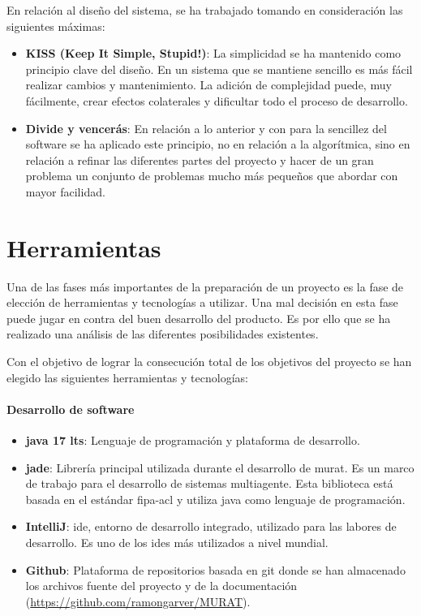 En relación al diseño del sistema, se ha trabajado tomando en consideración las siguientes máximas: 
\begin{itemize}
    \item \textbf{KISS (Keep It Simple, Stupid!)}: La simplicidad se ha mantenido como principio clave del diseño. En un sistema que se mantiene sencillo es más fácil realizar cambios y mantenimiento. La adición de complejidad puede, muy fácilmente, crear efectos colaterales y dificultar todo el proceso de desarrollo.
    \item \textbf{Divide y vencerás}: En relación a lo anterior y con para la sencillez del software se ha aplicado este principio, no en relación a la algorítmica, sino en relación a refinar las diferentes partes del proyecto y hacer de un gran problema un conjunto de problemas mucho más pequeños que abordar con mayor facilidad.
\end{itemize}


\section{Herramientas}
Una de las fases más importantes de la preparación de un proyecto es la fase de elección de herramientas y tecnologías a utilizar. Una mal decisión en esta fase puede jugar en contra del buen desarrollo del producto. Es por ello que se ha realizado una análisis de las diferentes posibilidades existentes.

Con el objetivo de lograr la consecución total de los objetivos del proyecto se han elegido las siguientes herramientas y tecnologías:

\paragraph{Desarrollo de software}
\begin{itemize}
    \item \textbf{\Gls{java} 17 \acrshort{lts}}: Lenguaje de programación y plataforma de desarrollo.
    \item \textbf{\acrshort{jade}}: Librería principal utilizada durante el desarrollo de \acrshort{murat}. Es un marco de trabajo para el desarrollo de sistemas multiagente. Esta biblioteca está basada en el estándar \Gls{fipa-acl} y utiliza \Gls{java} como lenguaje de programación.
    \item \textbf{IntelliJ}: \acrfull{ide}, entorno de desarrollo integrado, utilizado para las labores de desarrollo. Es uno de los \acrshort{ide}s más utilizados a nivel mundial.
    \item \textbf{Github}: Plataforma de repositorios basada en \Gls{git} donde se han almacenado los archivos fuente del proyecto y de la documentación (\url{https://github.com/ramongarver/MURAT}).
\end{itemize}

